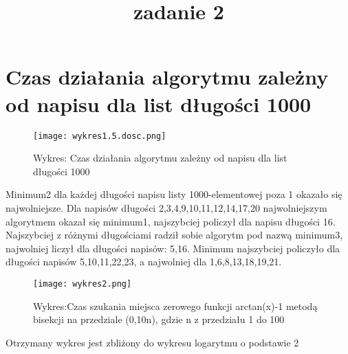 \documentclass{mwart}
\begin{document}
	\medskip
	\medskip
	\medskip
	\medskip
	\medskip
	
	\section{\textbf{Czas działania algorytmu zależny od napisu dla list długości 1000}}\label{Czas działania algorytmu zależny od napisu dla list długości 1000}
	
	\medskip
	
	\begin{figure}[H]
		\begin{center}
			\texttt{[image: wykres1.5.dosc.png]}
			\caption{Wykres: Czas działania algorytmu zależny od napisu dla list długości 1000}
		\end{center}
	\end{figure}
	
	\medskip
	
	\begin{pysub}
		
		Minimum2 dla każdej długości napisu listy 1000-elementowej poza 1 okazało się najwolniejsze. Dla napisów długości 2,3,4,9,10,11,12,14,17,20 najwolniejszym algorytmem okazał się minimum1, najszybciej policzył dla napisu długości 16. Najszybciej z różnymi długościami radził sobie algorytm pod nazwą minimum3, najwolniej liczył dla długości napisów: 5,16. Minimum najszybciej policzyło dla długości napisów 5,10,11,22,23, a najwolniej dla 1,6,8,13,18,19,21.
		
	\end{pysub}
	\medskip
	\begin{center}
		\title{\textbf{zadanie 2}}
	\end{center}
	\medskip
	
	\begin{figure}[H]
		\begin{center}
			\texttt{[image: wykres2.png]}
			\caption{Wykres:Czas szukania miejsca zerowego funkcji arctan(x)-1 metodą bisekcji na przedziale (0,10n), gdzie n z przedziału 1 do 100}
		\end{center}
	\end{figure}
	
	\begin{pysub}
		
		Otrzymany wykres jest zbliżony do wykresu logarytmu o podstawie 2
		
	\end{pysub}
	
	
\end{document}
